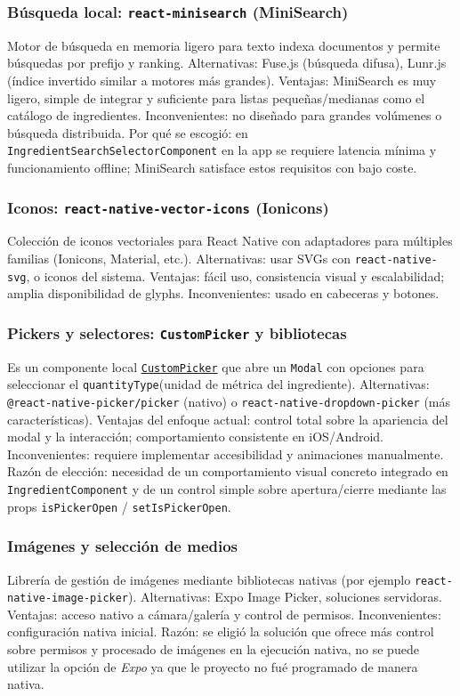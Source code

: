 \documentclass[twoside, openright, 11pt]{report}
\begin{document}
\begin{enumerate}
	\subsubsection*{Búsqueda local: \texttt{react-minisearch} (MiniSearch)}
	Motor de búsqueda en memoria ligero para texto indexa documentos y permite búsquedas por prefijo y ranking.  
	Alternativas: Fuse.js (búsqueda difusa), Lunr.js (índice invertido similar a motores más grandes).  
	Ventajas: MiniSearch es muy ligero, simple de integrar y suficiente para listas pequeñas/medianas como el catálogo de ingredientes. Inconvenientes: no diseñado para grandes volúmenes o búsqueda distribuida.  
	Por qué se escogió: en \texttt{IngredientSearchSelectorComponent} en la app se requiere latencia mínima y funcionamiento offline; MiniSearch satisface estos requisitos con bajo coste.
	
	\subsubsection*{Iconos: \texttt{react-native-vector-icons} (Ionicons)}
	Colección de iconos vectoriales para React Native con adaptadores para múltiples familias (Ionicons, Material, etc.).  
	Alternativas: usar SVGs con \texttt{react-native-svg}, o iconos del sistema.  
	Ventajas: fácil uso, consistencia visual y escalabilidad; amplia disponibilidad de glyphs. Inconvenientes: usado en cabeceras y botones.
	
	\subsubsection*{Pickers y selectores: \texttt{CustomPicker} y bibliotecas}
	Es un componente local \texttt{\hyperref[CustomPicker]{CustomPicker}} que abre un \texttt{Modal} con opciones para seleccionar el \texttt{quantityType}(unidad de métrica del ingrediente).
	Alternativas: \texttt{@react-native-picker/picker} (nativo) o \texttt{react-native-dropdown-picker} (más características).  
	Ventajas del enfoque actual: control total sobre la apariencia del modal y la interacción; comportamiento consistente en iOS/Android. Inconvenientes: requiere implementar accesibilidad y animaciones manualmente.  
	Razón de elección: necesidad de un comportamiento visual concreto integrado en \texttt{IngredientComponent} y de un control simple sobre apertura/cierre mediante las props \texttt{isPickerOpen} / \texttt{setIsPickerOpen}.
	
	
	
	\subsubsection*{Imágenes y selección de medios}
	Librería de gestión de imágenes mediante bibliotecas nativas (por ejemplo \texttt{react-native-image-picker}).  
	Alternativas: Expo Image Picker, soluciones servidoras.  
	Ventajas: acceso nativo a cámara/galería y control de permisos. Inconvenientes: configuración nativa inicial.  
	Razón: se eligió la solución que ofrece más control sobre permisos y procesado de imágenes en la ejecución nativa, no se puede utilizar la opción de \textit{Expo} ya que le proyecto no fué programado de manera nativa.
  

\end{enumerate}
\end{document}
